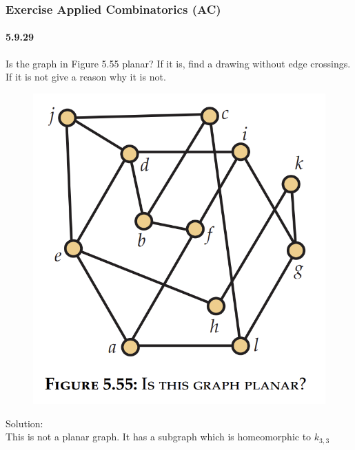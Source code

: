 \documentclass{article}
\begin{document}
\subsubsection{Exercise Applied Combinatorics (AC)}
\paragraph{5.9.29}
Is the graph in Figure 5.55 planar? If it is, find a drawing without edge crossings. If it is not give a reason why it is not.
\begin{figure}[H]
    \centering
    \includegraphics{0116}
\end{figure}
Solution:\\
This is not a planar graph. It has a subgraph which is homeomorphic to $k_{3,3}$
\end{document}
